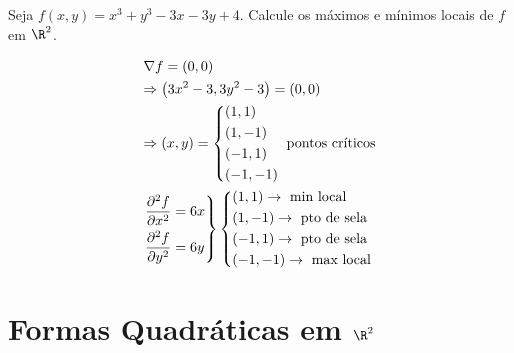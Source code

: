\documentclass[11pt, oneside, a4paper]{gsm-l}
\begin{document}
\begin{exem}
    Seja $f\left( {x,y} \right) = x^3  + y^3  - 3x - 3y + 4$. Calcule os máximos e mínimos locais de $f$ em $\R^2$.
\end{exem}

\begin{sol}
\[
\begin{gathered}
\nabla f = \left( {0,0} \right) \hfill \\
   \Rightarrow \left( {3x^2  - 3,3y^2  - 3} \right) = \left( {0,0} \right) \hfill \\
\Rightarrow \left( {x,y} \right) = \left\{ \begin{gathered}
\left( {1,1} \right) \hfill \\
\left( {1, - 1} \right) \hfill \\
\left( { - 1,1} \right) \hfill \\
\left( { - 1, - 1} \right) \hfill \\
\end{gathered}  \right.{\text{ pontos críticos}} \hfill \\
\left. \begin{gathered}
\frac{{\partial ^2 f}}
{{\partial x^2 }} = 6x \hfill \\
\frac{{\partial ^2 f}}
{{\partial y^2 }} = 6y \hfill \\
\end{gathered}  \right\}\left\{ \begin{gathered}
\left( {1,1} \right) \to {\text{ min local}} \hfill \\
\left( {1, - 1} \right) \to {\text{ pto de sela}} \hfill \\
\left( { - 1,1} \right) \to {\text{ pto de sela}} \hfill \\
\left( { - 1, - 1} \right) \to {\text{ max local}} \hfill \\
\end{gathered}  \right. \hfill \\
\end{gathered}
\]

\end{sol}

\section{Formas Quadráticas em $\R^2$} \label{sec21}
\end{document}
